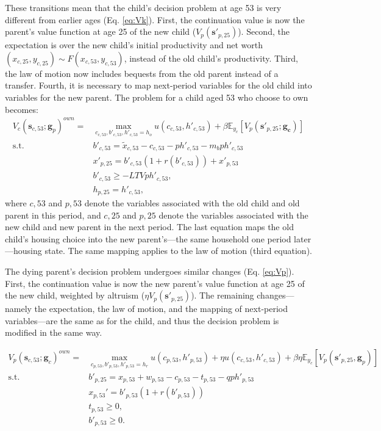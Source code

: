 \documentclass[12pt]{article}
\newcommand{\E}{\mathbb{E}}
\begin{document}
These transitions mean that the child's decision problem at age 53 is very different from earlier ages (Eq. \ref{eq:Vk}). First, the continuation value is now the parent's value function at age 25 of the new child ($V_{p}({\mathbf{s}'_{p,25}})$). Second, the expectation is over the new child's initial productivity and net worth $(x_{c,25},y_{c,25})\sim F(x_{c,53},y_{c,53})$, instead of the old child's productivity. Third, the law of motion now includes bequests from the old parent instead of a transfer. Fourth, it is necessary to map next-period variables for the old child into variables for the new parent. The problem for a child aged 53 who choose to own becomes:
\begin{equation*}
\begin{split}
V_c(\mathbf{s}_{c,53};\mathbf{g}_p)^{own} = &\max_{c_{c,53},b'_{c,53},h'_{c,53}=h_o} u(c_{c,53},h'_{c,53}) + \beta \E_{y_c}\left[V_{p}({\mathbf{s}'_{p,25}};\mathbf{g_c}) \right] \\
\text{s.t.}\quad & 	b'_{c,53} = \tilde x_{c,53} - c_{c,53} - p h'_{c,53}  - m_b p h'_{c,53} \\
& x'_{p,25} = b'_{c,53}(1+r(b'_{c,53})) + x'_{p,53} \\
& b'_{c,53} \ge -LTV p h'_{c,53}, \\
& h_{p,25} = h'_{c,53},
\end{split}
\end{equation*} 
where $c,53$ and $p,53$ denote the variables associated with the old child and old parent in this period, and $c,25$ and $p,25$ denote the variables associated with the new child and new parent in the next period. The last equation maps the old child's housing choice into the new parent's---the same household one period later---housing state. The same mapping applies to the law of motion (third equation).

The dying parent's decision problem undergoes similar changes (Eq. \ref{eq:Vp}). First, the continuation value is now the new parent's value function at age 25 of the new child, weighted by altruism ($\eta V_p(\mathbf{s}'_{p,25})$). The remaining changes---namely the expectation, the law of motion, and the mapping of next-period variables---are the same as for the child, and thus the decision problem is modified in the same way.

\begin{equation*}
	\begin{split}
	V_p(\mathbf{s}_{c,53};\mathbf{g}_c)^{own} = &\max_{c_{p,53},b'_{p,53},h'_{p,53}=h_r} u(c_{p,53},h'_{p,53}) + \eta u(c_{c,53},h'_{c,53}) + \beta \eta \E_{y_c}\left[V_{p}({\mathbf{s}'_{p,25}},\mathbf{g}_p) \right] \\
	\text{s.t.}\quad & b'_{p,25} = x_{p,53} + w_{p,53} - c_{p,53} - t_{p,53} - q p h'_{p,53}\\
	& x_{p,53}' = b'_{p,53}(1+r(b'_{p,53})) \\
	& t_{p,53}\ge 0, \\
	& b'_{p,53}\ge 0. \\
	\end{split}
\end{equation*} 
\end{document}
